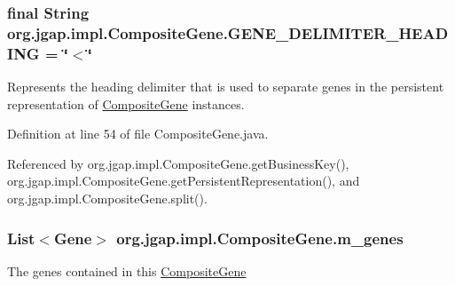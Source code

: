\hypertarget{classorg_1_1jgap_1_1impl_1_1_composite_gene_aedd0a6ff682d116a12aabf06b110922a}{
\subsubsection[{G\-E\-N\-E\-\_\-\-D\-E\-L\-I\-M\-I\-T\-E\-R\-\_\-\-H\-E\-A\-D\-I\-N\-G}]{\setlength{\rightskip}{0pt plus 5cm}final String org.\-jgap.\-impl.\-Composite\-Gene.\-G\-E\-N\-E\-\_\-\-D\-E\-L\-I\-M\-I\-T\-E\-R\-\_\-\-H\-E\-A\-D\-I\-N\-G = \char`\"{}$<$\char`\"{}\hspace{0.3cm}{\ttfamily [static]}}}\label{classorg_1_1jgap_1_1impl_1_1_composite_gene_aedd0a6ff682d116a12aabf06b110922a}
Represents the heading delimiter that is used to separate genes in the persistent representation of \hyperlink{classorg_1_1jgap_1_1impl_1_1_composite_gene}{Composite\-Gene} instances. 

Definition at line 54 of file Composite\-Gene.\-java.



Referenced by org.\-jgap.\-impl.\-Composite\-Gene.\-get\-Business\-Key(), org.\-jgap.\-impl.\-Composite\-Gene.\-get\-Persistent\-Representation(), and org.\-jgap.\-impl.\-Composite\-Gene.\-split().

\hypertarget{classorg_1_1jgap_1_1impl_1_1_composite_gene_a20eb52e3e6e1966527dd8a7282660b2c}{
\subsubsection[{m\-\_\-genes}]{\setlength{\rightskip}{0pt plus 5cm}List$<${\bf Gene}$>$ org.\-jgap.\-impl.\-Composite\-Gene.\-m\-\_\-genes\hspace{0.3cm}{\ttfamily [private]}}}\label{classorg_1_1jgap_1_1impl_1_1_composite_gene_a20eb52e3e6e1966527dd8a7282660b2c}
The genes contained in this \hyperlink{classorg_1_1jgap_1_1impl_1_1_composite_gene}{Composite\-Gene}

